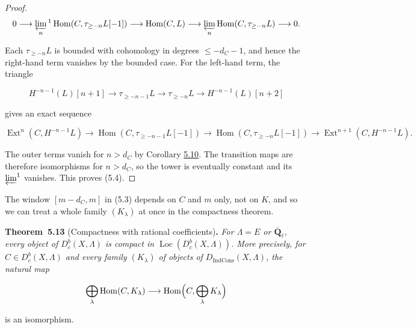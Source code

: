 \documentclass[11pt]{article}
\newenvironment{bpstatement}[2]{\par\addvspace{0.6\baselineskip}\noindent\textbf{#1}#2\textbf{.}\enspace\ignorespaces}
  {\par\addvspace{0.4\baselineskip}}
\newenvironment{bpstatementit}[2]{\begin{bpstatement}{#1}{#2}\itshape\ignorespaces}{\end{bpstatement}}
\providecommand{\Dbc}{}\renewcommand{\Dbc}{D^b_c}
\providecommand{\Dic}{}\renewcommand{\Dic}{D_{\IndCons}}
\providecommand{\Ext}{}\renewcommand{\Ext}{\operatorname{Ext}}
\providecommand{\Hom}{}\renewcommand{\Hom}{\operatorname{Hom}}
\providecommand{\IndCons}{}\renewcommand{\IndCons}{\operatorname{IndCons}}
\providecommand{\Loc}{}\renewcommand{\Loc}{\operatorname{Loc}}
\begin{document}
\begin{proof}[{Proof}]
\[
0\longrightarrow\varprojlim_n{}^1
\Hom(C,\tau_{\geq-n}L[-1])
\longrightarrow\Hom(C,L)
\longrightarrow\varprojlim_n\Hom(C,\tau_{\geq-n}L)
\longrightarrow0.
\]

Each \(\tau_{\geq-n}L\) is bounded with cohomology in degrees \(\leq-d_C-1\), and hence the right-hand term vanishes by the bounded case. For the left-hand term, the triangle

\[
H^{-n-1}(L)[n+1]\longrightarrow \tau_{\geq-n-1}L
\longrightarrow \tau_{\geq-n}L\longrightarrow H^{-n-1}(L)[n+2]
\]

gives an exact sequence

\[
\Ext^{n}(C,H^{-n-1}L)\to\Hom(C,\tau_{\geq-n-1}L[-1])\to\Hom(C,\tau_{\geq-n}L[-1])
\to\Ext^{n+1}(C,H^{-n-1}L).
\]

The outer terms vanish for \(n>d_C\) by Corollary \hyperref[bp30]{5.10}. The transition maps are therefore isomorphisms for \(n>d_C\), so the tower is eventually constant and its \(\varprojlim^1\) vanishes. This proves (5.4).
\end{proof}

\label{bp39}%
The window \([m-d_C,m]\) in (5.3) depends on \(C\) and \(m\) only, not on \(K\), and so we can treat a whole family \((K_\lambda)\) at once in the compactness theorem.

\label{bp40}%
\begin{bpstatementit}{Theorem~5.13}{ (Compactness with rational coefficients)}
For \(\Lambda=E\) or \(\overline{\mathbf Q}_\ell\), every object of \(\Dbc(X,\Lambda)\) is compact in \(\Loc(\Dbc(X,\Lambda))\). More precisely, for \(C\in\Dbc(X,\Lambda)\) and every family \((K_\lambda)\) of objects of \(\Dic(X,\Lambda)\), the natural map

\[
\bigoplus_\lambda\Hom(C,K_\lambda)
\longrightarrow\Hom\Bigl(C,\bigoplus_\lambda K_\lambda\Bigr)
\]

is an isomorphism.
\end{bpstatementit}
\end{document}
